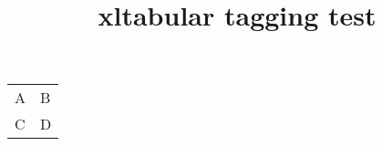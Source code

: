 \documentclass{article}
\title{xltabular tagging test}
\begin{document}
\begin{xltabular}{\linewidth}{XX}
A & B \\
C & D \\
\end{xltabular} 
\end{document}
